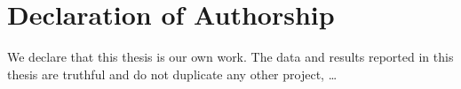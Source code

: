 \chapter*{Declaration of Authorship}
\label{reassurances}

We declare that this thesis is our own work. The data and results reported
in this thesis are truthful and do not duplicate any other project, \ldots
